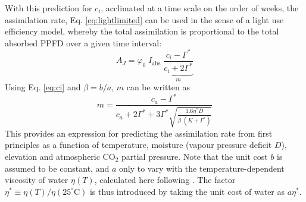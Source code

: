 \documentclass{myreport}
\begin{document}
With this prediction for $c_i$, acclimated at a time scale on the order of weeks, the assimilation rate, Eq. \ref{eq:lightlimited} can be used in the sense of a light use efficiency model, whereby the total assimilation is proportional to the total absorbed PPFD over a given time interval:
\begin{equation}
\label{eq:lue}
        A_J = \varphi_0 \; I_{\mathrm{abs}}\;\underbrace{\frac{c_i - \Gamma^{\ast}}{c_i + 2\Gamma^{\ast}}}_{m}
\end{equation}
Using Eq. \ref{eq:ci} and $\beta=b/a$, $m$ can be written as
\begin{equation}
    m = \frac{c_a - \Gamma^{\ast}}{c_a + 2 \Gamma^{\ast} + 3 \Gamma^{\ast} \sqrt{\frac{1.6 \eta^{\ast} D }{\beta\;(K+\Gamma^{\ast})}}}
\end{equation}
This provides an expression for predicting the assimilation rate from first principles as a function of temperature, moisture (vapour pressure deficit $D$), elevation and atmospheric CO$_2$ partial pressure. Note that the unit cost $b$ is assumed to be constant, and $a$ only to vary with the temperature-dependent viscosity of water $\eta(T)$, calculated here following \cite{huber09}. The factor $\eta^\ast \equiv \eta(T) / \eta(25^{\circ}\text{C})$ is thus introduced by taking the unit cost of water as $a \eta^\ast$.
\end{document}

